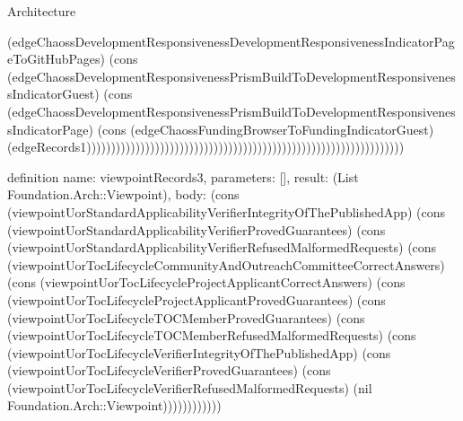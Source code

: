 \begin{lexlean}{Architecture}
\begin{semanticmodule}
{(edgeChaossDevelopmentResponsivenessDevelopmentResponsivenessIndicatorPageToGitHubPages) (cons (edgeChaossDevelopmentResponsivenessPrismBuildToDevelopmentResponsivenessIndicatorGuest) (cons (edgeChaossDevelopmentResponsivenessPrismBuildToDevelopmentResponsivenessIndicatorPage) (cons (edgeChaossFundingBrowserToFundingIndicatorGuest) (edgeRecords1)))))))))))))))))))))))))))))))))))))))))))))))))))))))))))))))))
}

definition{
  name: viewpointRecords3,
  parameters: [],
  result: (List Foundation.Arch::Viewpoint),
  body: (cons (viewpointUorStandardApplicabilityVerifierIntegrityOfThePublishedApp) (cons (viewpointUorStandardApplicabilityVerifierProvedGuarantees) (cons (viewpointUorStandardApplicabilityVerifierRefusedMalformedRequests) (cons (viewpointUorTocLifecycleCommunityAndOutreachCommitteeCorrectAnswers) (cons (viewpointUorTocLifecycleProjectApplicantCorrectAnswers) (cons (viewpointUorTocLifecycleProjectApplicantProvedGuarantees) (cons (viewpointUorTocLifecycleTOCMemberProvedGuarantees) (cons (viewpointUorTocLifecycleTOCMemberRefusedMalformedRequests) (cons (viewpointUorTocLifecycleVerifierIntegrityOfThePublishedApp) (cons (viewpointUorTocLifecycleVerifierProvedGuarantees) (cons (viewpointUorTocLifecycleVerifierRefusedMalformedRequests) (nil Foundation.Arch::Viewpoint))))))))))))
}


\end{semanticmodule}
\end{lexlean}

